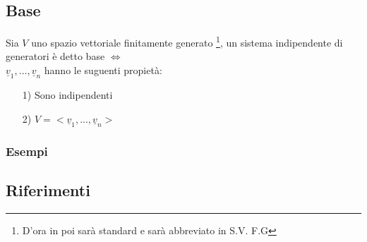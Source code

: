 \subsection{Base}
Sia $V$ uno spazio vettoriale finitamente generato \footnote{D'ora in poi sarà standard e sarà abbreviato in S.V. F.G}, un sistema indipendente di generatori è detto base $\Leftrightarrow$ \\
$\underline{v}_1,...,\underline{v}_n$ hanno le suguenti propietà:
\begin{itemize}
\item[1)] Sono indipendenti
\item[2)] $ V = < \underline{v}_1,...,\underline{v}_n > $
\end{itemize}

\subsubsection{Esempi}


\subsection{Riferimenti}




